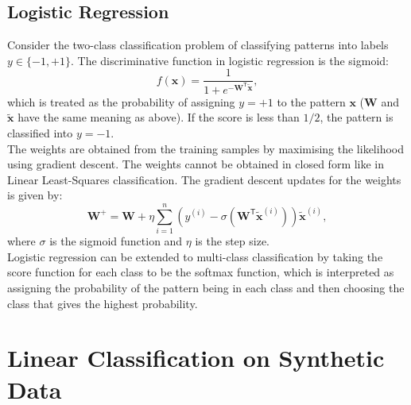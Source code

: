 \documentclass[12pt, a4 paper]{article}
\newcommand{\bx}{\mathbf{x}}
\newcommand{\bW}{\mathbf{W}}
\newcommand{\TT}{\mathsf{T}}
\begin{document}

\subsection{Logistic Regression}
\label{subsec:logisticRegression}

Consider the two-class classification problem of classifying patterns into labels $y \in \{-1, +1\}$. The discriminative function in logistic regression is the sigmoid:
\begin{equation}
	f(\bx) = \frac{1}{1+e^{-\bW^{\TT}\tilde{\bx}}},
\label{eq:logisticDiscriminator}
\end{equation}
which is treated as the probability of assigning $y=+1$ to the pattern $\bx$ ($\bW$ and $\tilde{\bx}$ have the same meaning as above). If the score is less than $1/2$, the pattern is classified into $y=-1$. \\

The weights are obtained from the training samples by maximising the likelihood using gradient descent. The weights cannot be obtained in closed form like in Linear Least-Squares classification. The gradient descent updates for the weights is given by:
\begin{equation}
	\bW^{+} = \bW + \eta \sum_{i=1}^{n} \left( y^{(i)} - \sigma(\bW^{\TT}\tilde{\bx}^{(i)}) \right) \tilde{\bx}^{(i)},
\label{eq:logGD}
\end{equation}
where $\sigma$ is the sigmoid function and $\eta$ is the step size. \\

Logistic regression can be extended to multi-class classification by taking the score function for each class to be the softmax function, which is interpreted as assigning the probability of the pattern being in each class and then choosing the class that gives the highest probability.


\section{Linear Classification on Synthetic Data}
\label{sec:LRandLOG}

\label{prob:1.a}
\end{document}
